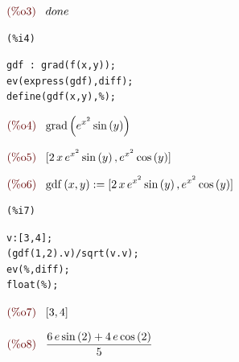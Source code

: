 \documentclass[12pt]{article}
\begin{document}
\begin{math}\displaystyle
\parbox{8ex}{\color{labelcolor}(\%o3) }
done
\end{math}


\noindent
\begin{minipage}[t]{8ex}{\color{red}\bf
\begin{verbatim}
(%i4) 
\end{verbatim}}
\end{minipage}
\begin{minipage}[t]{\textwidth}{\color{blue}
\begin{verbatim}
gdf : grad(f(x,y));
ev(express(gdf),diff);
define(gdf(x,y),%);
\end{verbatim}}
\end{minipage}
\begin{math}\displaystyle
\parbox{8ex}{\color{labelcolor}(\%o4) }
\mathrm{grad}\left( {e}^{{x}^{2}}\,\mathrm{sin}\left( y\right) \right) 
\end{math}

\begin{math}\displaystyle
\parbox{8ex}{\color{labelcolor}(\%o5) }
[2\,x\,{e}^{{x}^{2}}\,\mathrm{sin}\left( y\right) ,{e}^{{x}^{2}}\,\mathrm{cos}\left( y\right) ]
\end{math}

\begin{math}\displaystyle
\parbox{8ex}{\color{labelcolor}(\%o6) }
\mathrm{gdf}\left( x,y\right) :=[2\,x\,{e}^{{x}^{2}}\,\mathrm{sin}\left( y\right) ,{e}^{{x}^{2}}\,\mathrm{cos}\left( y\right) ]
\end{math}


\noindent
\begin{minipage}[t]{8ex}{\color{red}\bf
\begin{verbatim}
(%i7) 
\end{verbatim}}
\end{minipage}
\begin{minipage}[t]{\textwidth}{\color{blue}
\begin{verbatim}
v:[3,4];
(gdf(1,2).v)/sqrt(v.v);
ev(%,diff);
float(%);
\end{verbatim}}
\end{minipage}
\begin{math}\displaystyle
\parbox{8ex}{\color{labelcolor}(\%o7) }
[3,4]
\end{math}

\begin{math}\displaystyle
\parbox{8ex}{\color{labelcolor}(\%o8) }
\frac{6\,e\,\mathrm{sin}\left( 2\right) +4\,e\,\mathrm{cos}\left( 2\right) }{5}
\end{math}
\end{document}
